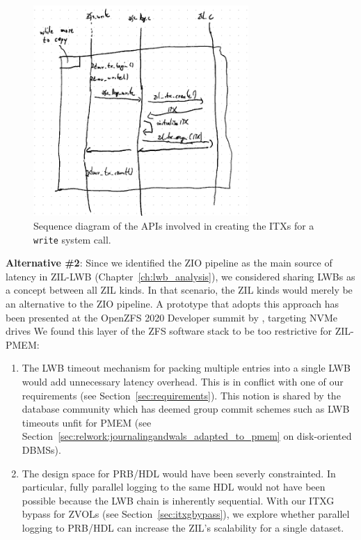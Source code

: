 \documentclass[12pt,a4paper,twoside]{book}
\begin{document}
\begin{figure}[H]
    \centering
    \includegraphics[height=8cm]{fig/zfs_log_write_sequence_diagram}
    \caption{Sequence diagram of the APIs involved in creating the ITXs for a \lstinline{write} system call.}
    \label{fig:zfs_log_write_sequence_diagram}
\end{figure}

\textbf{Alternative \#2}: Since we identified the ZIO pipeline as the main source of latency in ZIL-LWB (Chapter~\ref{ch:lwb_analysis}), we considered sharing LWBs as a concept between all ZIL kinds.
In that scenario, the ZIL kinds would merely be an alternative to the ZIO pipeline.
A prototype that adopts this approach has been presented at the OpenZFS 2020 Developer summit by \citeauthor{openzfsZILPerformanceImprovements2020}, targeting NVMe drives \cite{openzfsZILPerformanceImprovements2020}
We found this layer of the ZFS software stack to be too restrictive for ZIL-PMEM:
\begin{enumerate}[noitemsep]
    \item The LWB timeout mechanism for packing multiple entries into a single LWB would add unnecessary latency overhead.
        This is in conflict with one of our requirements (see Section~\ref{sec:requirements}).
        This notion is shared by the database community which has deemed group commit schemes such as LWB timeouts unfit for PMEM (see Section~\ref{sec:relwork:journalingandwals_adapted_to_pmem} on disk-oriented DBMSs).
    \item The design space for PRB/HDL would have been severly constrainted.
        In particular, fully parallel logging to the same HDL would not have been possible because the LWB chain is inherently sequential.
        With our ITXG bypass for ZVOLs (see Section~\ref{sec:itxgbypass}), we explore whether parallel logging to PRB/HDL can increase the ZIL's scalability for a single dataset.
\end{enumerate}
\end{document}
